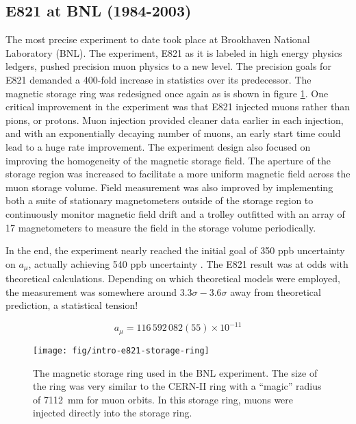 \subsection{E821 at BNL (1984-2003)}
The most precise \mugmtwo experiment to date took place at Brookhaven National Laboratory (BNL). The experiment, E821 as it is labeled in high energy physics ledgers, pushed precision muon physics to a new level.  The precision goals for E821 demanded a 400-fold increase in statistics over its predecessor.  The magnetic storage ring was redesigned once again as is shown in figure \ref{fig:intro-e821-storage-ring}.  One critical improvement in the experiment was that E821 injected muons rather than pions, or protons.  Muon injection provided cleaner data earlier in each injection, and with an exponentially decaying number of muons, an early start time could lead to a huge rate improvement.  The experiment design also focused on improving the homogeneity of the magnetic storage field.  The aperture of the storage region was increased to facilitate a more uniform magnetic field across the muon storage volume.  Field measurement was also improved by implementing both a suite of stationary magnetometers outside of the storage region to continuously monitor magnetic field drift and a trolley outfitted with an array of 17 magnetometers to measure the field in the storage volume periodically.

In the end, the experiment nearly reached the initial goal of 350 ppb uncertainty on $a_\mu$, actually achieving 540 ppb uncertainty \cite{e821-prd}.  The E821 \gmtwo result was at odds with theoretical calculations.  Depending on which theoretical models were employed, the measurement was somewhere around $3.3\sigma - 3.6\sigma$ away from theoretical prediction, a statistical tension!

\begin{equation}
\label{eqn:e821-results}
a_\mu = 116\,592\,082 (55) \times 10^{-11}
\end{equation}

\begin{figure}
\centering
\texttt{[image: fig/intro-e821-storage-ring]}
\caption{
    The magnetic storage ring used in the BNL experiment.  The size of the ring was very similar to the CERN-II ring with a ``magic'' radius of \SI{7112}{\mm} for muon orbits.  In this storage ring, muons were injected directly into the storage ring.
    \label{fig:intro-e821-storage-ring}
}
\end{figure}

